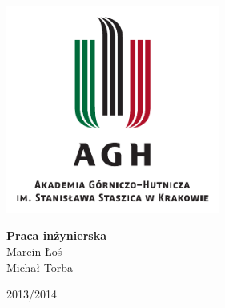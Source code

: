 
\begin{titlepage}
  \begin{center} 

    \includegraphics[width=7cm]{images/agh_logo}
    \vspace{0.5cm}

    {\Huge \textbf{Praca inżynierska}}
    \\
    \vspace{1cm}
    Marcin Łoś \\
    Michał Torba

    \vfill
    2013\slash 2014

  \end{center}
\end{titlepage}
